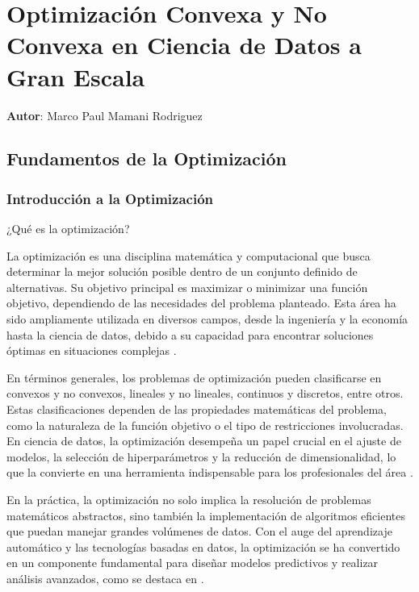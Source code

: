 

\chapter{Optimización Convexa y No Convexa en Ciencia de Datos a Gran Escala}
\textbf{Autor}: \large{Marco Paul Mamani Rodriguez}
\label{chap:3}

\section{Fundamentos de la Optimización}

\subsection{Introducción a la Optimización}

¿Qué es la optimización?

La optimización es una disciplina matemática y computacional que busca determinar la mejor solución posible dentro de un conjunto definido de alternativas. Su objetivo principal es maximizar o minimizar una función objetivo, dependiendo de las necesidades del problema planteado. Esta área ha sido ampliamente utilizada en diversos campos, desde la ingeniería y la economía hasta la ciencia de datos, debido a su capacidad para encontrar soluciones óptimas en situaciones complejas \cite{nocedal1999optimization}.

En términos generales, los problemas de optimización pueden clasificarse en convexos y no convexos, lineales y no lineales, continuos y discretos, entre otros. Estas clasificaciones dependen de las propiedades matemáticas del problema, como la naturaleza de la función objetivo o el tipo de restricciones involucradas. En ciencia de datos, la optimización desempeña un papel crucial en el ajuste de modelos, la selección de hiperparámetros y la reducción de dimensionalidad, lo que la convierte en una herramienta indispensable para los profesionales del área \cite{boyd2004convex}.

En la práctica, la optimización no solo implica la resolución de problemas matemáticos abstractos, sino también la implementación de algoritmos eficientes que puedan manejar grandes volúmenes de datos. Con el auge del aprendizaje automático y las tecnologías basadas en datos, la optimización se ha convertido en un componente fundamental para diseñar modelos predictivos y realizar análisis avanzados, como se destaca en \cite{goodfellow2016deep}.

